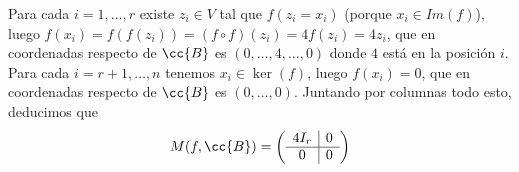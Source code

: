 \documentclass[12pt]{article}
\begin{document}
\begin{ejercicio}[2.5 puntos]
\begin{enumerate}
            Para cada $i = 1, \dots, r$ existe $z_i \in V$ tal que $f(z_i = x_i)$ (porque $x_i \in Im(f)$), luego $f(x_i) = f(f(z_i)) = (f \circ f)(z_i) = 4f(z_i) = 4z_i$, que en coordenadas respecto de $\cc{B}$ es $(0,\dots,4,\dots,0)$ donde $4$ está en la posición $i$. Para cada $i = r+1,\dots,n$ tenemos $x_i \in \ker(f)$, luego $f(x_i) = 0$, que en coordenadas respecto de $\cc{B}$ es $(0,\dots, 0)$. Juntando por columnas todo esto, deducimos que
            \begin{gather*}
                M(f, \cc{B}) = 
                \left(
                \begin{array}{c|c}
                    4 I_r &  0\\
                    \hline
                    0 & 0 \\
                \end{array}
                \right)
            \end{gather*} 
        \end{enumerate}
    \end{ejercicio}
    
\end{document}
